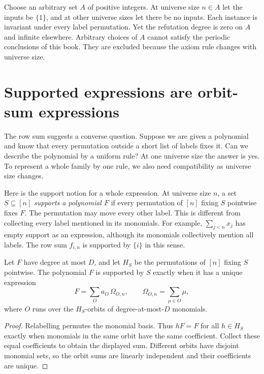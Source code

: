 \begin{example}\label{tx:eg:not-uniform}
Choose an arbitrary set $A$ of positive integers. At universe size $n\in A$
let the inputs be $\{1\}$, and at other universe sizes let there be no inputs.
Each instance is invariant under every label permutation. Yet the
refutation degree is zero on $A$ and infinite elsewhere. Arbitrary
choices of $A$ cannot satisfy the periodic conclusions of this book.
They are excluded because the axiom rule changes with universe size.
\end{example}

\section{Supported expressions are orbit-sum expressions}\label{tx:sec:supported-expressions}
The row sum suggests a converse question. Suppose we are given a
polynomial and know that every permutation outside a short list of
labels fixes it. Can we describe the polynomial by a uniform rule?
At one universe size the answer is yes. To represent a whole family by one
rule, we also need compatibility as universe size changes.

Here is the support notion for a whole expression. At universe size $n$, a set
$S\subseteq[n]$ \emph{supports a polynomial $F$} if every permutation
of $[n]$ fixing $S$ pointwise fixes $F$. The permutation may move every
other label. This is different from collecting every label mentioned
in its monomials. For example, $\sum_{j<n}x_j$ has empty support as an
expression, although its monomials collectively mention all labels.
The row sum $f_{i,n}$ is supported by $\{i\}$ in this sense.

\begin{proposition}\label{tx:prop:orbit-sum}
Let $F$ have degree at most $D$, and let $H_S$ be the permutations of
$[n]$ fixing $S$ pointwise. The polynomial $F$ is supported by $S$
exactly when it has a unique expression
\[
             F=\sum_O a_O\,\Omega_{O,n},\qquad
             \Omega_{O,n}=\sum_{\mu\in O}\mu,
\]
where $O$ runs over the $H_S$-orbits of degree-at-most-$D$ monomials.
\end{proposition}
\begin{proof}
Relabelling permutes the monomial basis. Thus $hF=F$ for all $h\in H_S$
exactly when monomials in the same orbit have the same coefficient.
Collect these equal coefficients to obtain the displayed sum.
Different orbits have disjoint monomial sets, so the orbit sums are
linearly independent and their coefficients are unique.
\end{proof}

